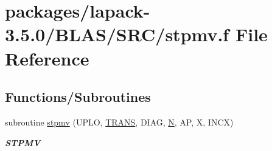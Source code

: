 \hypertarget{lapack-3_85_80_2BLAS_2SRC_2stpmv_8f}{}\section{packages/lapack-\/3.5.0/\+B\+L\+A\+S/\+S\+R\+C/stpmv.f File Reference}
\label{lapack-3_85_80_2BLAS_2SRC_2stpmv_8f}
\subsection*{Functions/\+Subroutines}
\begin{DoxyCompactItemize}
\item 
subroutine \hyperlink{group__single__blas__level2_ga7bbe5634d34a5fcb12d877e700e0ac86}{stpmv} (U\+P\+L\+O, \hyperlink{superlu__enum__consts_8h_a0c4e17b2d5cea33f9991ccc6a6678d62a1f61e3015bfe0f0c2c3fda4c5a0cdf58}{T\+R\+A\+N\+S}, D\+I\+A\+G, \hyperlink{polmisc_8c_a0240ac851181b84ac374872dc5434ee4}{N}, A\+P, X, I\+N\+C\+X)
\begin{DoxyCompactList}\small\item\em {\bfseries S\+T\+P\+M\+V} \end{DoxyCompactList}\end{DoxyCompactItemize}

